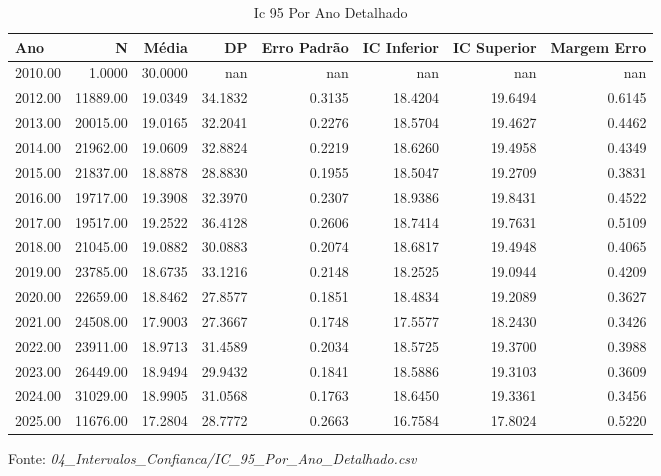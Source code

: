 \begin{table}[H]
\centering
\small
\caption{Ic 95 Por Ano Detalhado}
\label{tab:05_04_Intervalos_Confianca}
\begin{tabular}{|l|r|r|r|r|r|r|r|}
\hline
\textbf{Ano} & \textbf{N} & \textbf{Média} & \textbf{DP} & \textbf{Erro Padrão} & \textbf{IC Inferior} & \textbf{IC Superior} & \textbf{Margem Erro} \\
\hline
2010.00 & 1.0000 & 30.0000 & nan & nan & nan & nan & nan \\
2012.00 & 11889.00 & 19.0349 & 34.1832 & 0.3135 & 18.4204 & 19.6494 & 0.6145 \\
2013.00 & 20015.00 & 19.0165 & 32.2041 & 0.2276 & 18.5704 & 19.4627 & 0.4462 \\
2014.00 & 21962.00 & 19.0609 & 32.8824 & 0.2219 & 18.6260 & 19.4958 & 0.4349 \\
2015.00 & 21837.00 & 18.8878 & 28.8830 & 0.1955 & 18.5047 & 19.2709 & 0.3831 \\
2016.00 & 19717.00 & 19.3908 & 32.3970 & 0.2307 & 18.9386 & 19.8431 & 0.4522 \\
2017.00 & 19517.00 & 19.2522 & 36.4128 & 0.2606 & 18.7414 & 19.7631 & 0.5109 \\
2018.00 & 21045.00 & 19.0882 & 30.0883 & 0.2074 & 18.6817 & 19.4948 & 0.4065 \\
2019.00 & 23785.00 & 18.6735 & 33.1216 & 0.2148 & 18.2525 & 19.0944 & 0.4209 \\
2020.00 & 22659.00 & 18.8462 & 27.8577 & 0.1851 & 18.4834 & 19.2089 & 0.3627 \\
2021.00 & 24508.00 & 17.9003 & 27.3667 & 0.1748 & 17.5577 & 18.2430 & 0.3426 \\
2022.00 & 23911.00 & 18.9713 & 31.4589 & 0.2034 & 18.5725 & 19.3700 & 0.3988 \\
2023.00 & 26449.00 & 18.9494 & 29.9432 & 0.1841 & 18.5886 & 19.3103 & 0.3609 \\
2024.00 & 31029.00 & 18.9905 & 31.0568 & 0.1763 & 18.6450 & 19.3361 & 0.3456 \\
2025.00 & 11676.00 & 17.2804 & 28.7772 & 0.2663 & 16.7584 & 17.8024 & 0.5220 \\
\hline
\end{tabular}
\begin{flushleft}
\small Fonte: \textit{04_Intervalos_Confianca/IC_95_Por_Ano_Detalhado.csv}
\end{flushleft}
\end{table}
